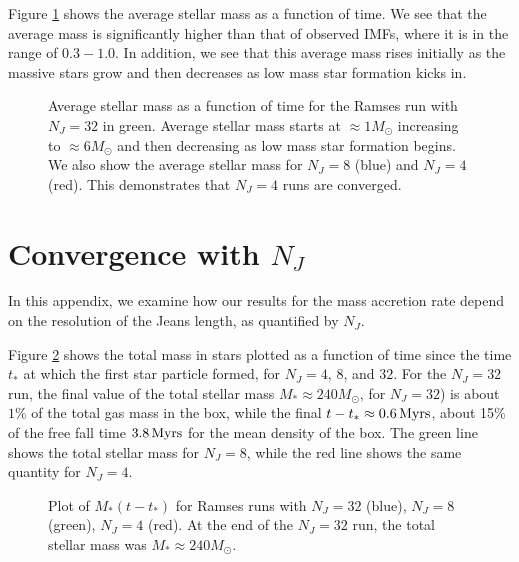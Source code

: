 \documentclass[../dissertation.tex]{subfiles}
\begin{document}
Figure \ref{fig:hydro_avg_mass} shows the average stellar mass as a function of time. We see that the average mass is significantly higher than that of observed IMFs, where it is in the range of $0.3 - 1.0$. In addition, we see that this average mass rises initially as the massive stars grow and then decreases as low mass star formation kicks in.

\begin{figure}[htb]
\caption[Hydro Average Stellar Mass as a function of time since the first star formed]{Average stellar mass as a function of time for the Ramses run with $N_J = 32$ in green. Average stellar mass starts at $\approx 1 M_\odot$ increasing to $\approx 6 M_\odot$ and then decreasing as low mass star formation begins. We also show the average stellar mass for $N_J = 8$ (blue) and $N_J = 4$ (red). This demonstrates that $N_J = 4$ runs are converged. \label{fig:hydro_avg_mass}}
\end{figure}

\section{Convergence with $N_J$}

In this appendix, we examine how our results for the mass accretion rate depend on the resolution of the Jeans length, as quantified by $N_J$. 

Figure \ref{fig:hydro_Convergence} shows the total mass in stars plotted as a function of time since the time $t_*$ at which the first star particle formed, for $N_J=4,\,8$, and $32$.
For the $N_J=32$ run, the final value of the total stellar mass $M_*\approx 240M_\odot$, for $N_J =32$) 
is about $1\%$ of the total gas mass in the box, while the final $t-t_*\approx 0.6\,\rm Myrs$, 
about 15\% of the free fall time $3.8\,\rm Myrs$ for the mean density of the box. 
The green line shows the total stellar mass for $N_J = 8$, while the red line shows the same quantity for $N_J = 4$.

\begin{figure}[htb]
\caption[Hydro Convergence in Jeans Length]{Plot of $M_*(t-t_*)$ for Ramses runs with $N_J = 32$ (blue), $N_J = 8$ (green), $N_J = 4$ (red). At the end of the $N_J = 32$ run, the total stellar mass was $M_*\approx 240M_\odot$. \label{fig:hydro_Convergence}}
\end{figure}
\end{document}
